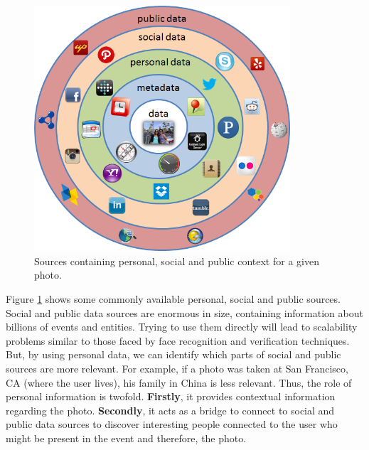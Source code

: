 \begin{figure}[h]
\centering
\includegraphics[width=0.85\textwidth]{media/chapter2/personal-social-public-data-sources.png}
\caption{Sources containing personal, social and public context for a given photo.}
\label{fig:personal-social-public-sources}
\end{figure}

Figure \ref{fig:personal-social-public-sources} shows some commonly available personal, social and public sources. Social and public data sources are enormous in size, containing information about billions of events and entities. Trying to use them directly will lead to scalability problems similar to those faced by face recognition and verification techniques. But, by using personal data, we can identify which parts of social and public sources are more relevant. For example, if a photo was taken at San Francisco, CA (where the user lives), his family in China is less relevant. Thus, the role of personal information is twofold. \textbf{Firstly}, it provides contextual information regarding the photo. \textbf{Secondly}, it acts as a bridge to connect to social and public data sources to discover interesting people connected to the user who might be present in the event and therefore, the photo.

